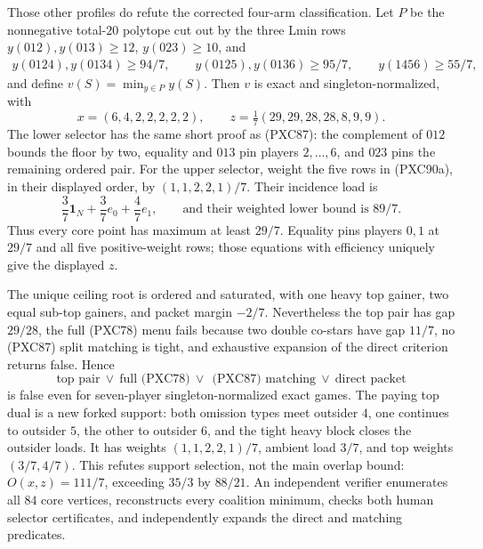 \documentclass[11pt]{article}
\newcommand{\one}{\mathbf 1}
\begin{document}
Those other profiles do refute the corrected four-arm classification.  Let
$P$ be the nonnegative total-$20$ polytope cut out by the three Lmin rows
$y(012),y(013)\ge12$, $y(023)\ge10$, and
\[
\begin{gathered}
 y(0124),y(0134)\ge94/7,\qquad
 y(0125),y(0136)\ge95/7,\qquad y(1456)\ge55/7,
                                                               \tag{PXC90a}
\end{gathered}
\]
and define $v(S)=\min_{y\in P}y(S)$.  Then $v$ is exact and
singleton-normalized, with
\[
 x=(6,4,2,2,2,2,2),\qquad
 z=\tfrac17(29,29,28,28,8,9,9).                    \tag{PXC90b}
\]
The lower selector has the same short proof as (PXC87): the complement of
$012$ bounds the floor by two, equality and $013$ pin players $2,\ldots,6$,
and $023$ pins the remaining ordered pair.  For the upper selector, weight
the five rows in (PXC90a), in their displayed order, by
$(1,1,2,2,1)/7$.  Their incidence load is
\[
 \frac37\one_N+\frac37e_0+\frac47e_1,
 \qquad \text{and their weighted lower bound is }89/7.
\]
Thus every core point has maximum at least $29/7$.  Equality pins players
$0,1$ at $29/7$ and all five positive-weight rows; those equations with
efficiency uniquely give the displayed $z$.

The unique ceiling root is ordered and saturated, with one heavy top gainer,
two equal sub-top gainers, and packet margin $-2/7$.  Nevertheless the top
pair has gap $29/28$, the full (PXC78) menu fails because two double co-stars
have gap $11/7$, no (PXC87) split matching is tight, and exhaustive expansion
of the direct criterion returns false.  Hence
\[
 \boxed{\text{top pair}\ \vee\ \text{full (PXC78)}\ \vee\
 \ \text{(PXC87) matching}\ \vee\ \text{direct packet}}
                                                               \tag{PXC90}
\]
is false even for seven-player singleton-normalized exact games.  The paying
top dual is a new forked support: both omission types meet outsider $4$, one
continues to outsider $5$, the other to outsider $6$, and the tight heavy
block closes the outsider loads.  It has weights $(1,1,2,2,1)/7$, ambient
load $3/7$, and top weights $(3/7,4/7)$.  This refutes support selection, not
the main overlap bound: $O(x,z)=111/7$, exceeding $35/3$ by $88/21$.
An independent verifier enumerates all $84$ core vertices, reconstructs every
coalition minimum, checks both human selector certificates, and independently
expands the direct and matching predicates.
\end{document}
